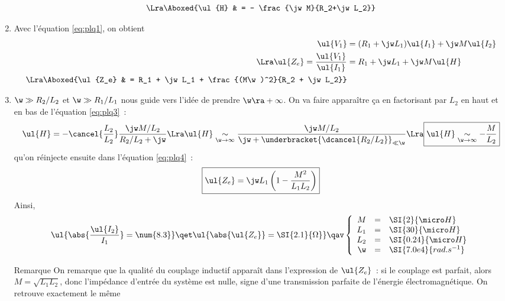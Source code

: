 \documentclass[a4paper, 10pt, final, garamond]{book}
\begin{document}
\begin{enumerate}
\begin{align}
		      \notag
		      \\\Lra
		      \label{eq:plq3}
		      \Aboxed{\ul{H} & = - \frac{\jw M}{R_2+\jw L_2}}
	      \end{align}
	\item Avec l'équation \ref{eq:plq1}, on obtient
	      \begin{align}
		      \ul{V_1}                             & =
		      (R_1 + \jw L_1)\ul{I_1} + \jw M \ul{I_2}
		      \notag
		      \\\Lra
		      \ul{Z_e} = \frac{\ul{V_1}}{\ul{I_1}} & =
		      R_1 + \jw L_1 + \jw M \ul{H}
		      \notag
		      \\\Lra
		      \label{eq:plq4}
		      \Aboxed{\ul{Z_e}                     & =
			      R_1 + \jw L_1 + \frac{(M\w)^2}{R_2 + \jw L_2}}
	      \end{align}
	\item $\w \gg R_2/L_2$ et $\w \gg R_1/L_1$ nous guide vers l'idée de
	      prendre $\w \ra +\infty$. On va faire apparaître ça en factorisant par
	      $L_2$ en haut et en bas de l'équation \ref{eq:plq3}~:
	      \[
		      \ul{H} = - \cancel{\frac{L_2}{L_2}} \frac{\jw M/L_2}{R_2/L_2 + \jw}
		      \Lra
		      \ul{H} \underset{\w \to \infty}{\sim} \frac{\jw M/L_2}{\jw +
			      \underbracket{\dcancel{R_2/L_2}}_{\ll \w}}
		      \Lra
		      \boxed{\ul{H} \underset{\w \to \infty}{\sim} - \frac{M}{L_2}}
	      \]
	      qu'on réinjecte ensuite dans l'équation \ref{eq:plq4}~:
	      \[
		      \boxed{\ul{Z_e} = \jw L_1 \left( 1 - \frac{M^2}{L_1L_2} \right)}
	      \]
	      Ainsi,
	      \[
		      \ul{\abs{\frac{\ul{I_2}}{I_1}} = \num{8.3}}
		      \qet
		      \ul{\abs{\ul{Z_e}} = \SI{2.1}{\Omega}}
		      \qav
		      \left\{
		      \begin{array}{rcl}
			      M   & = & \SI{2}{\micro H}
			      \\
			      L_1 & = & \SI{30}{\micro H}
			      \\
			      L_2 & = & \SI{0.24}{\micro H}
			      \\
			      \w  & = & \SI{7.0e4}{rad.s^{-1}}
		      \end{array}
		      \right.
	      \]
	      \begin{rrema}{Remarque}
		      On remarque que la qualité du couplage inductif apparaît dans l'expression
		      de $\ul{Z_e}$~: si le couplage est parfait, alors $M = \sqrt{L_1L_2}$,
		      donc l'impédance d'entrée du système est nulle, signe d'une transmission
		      parfaite de l'énergie électromagnétique. On retrouve exactement le même

\end{rrema}
\end{enumerate}
\end{document}
